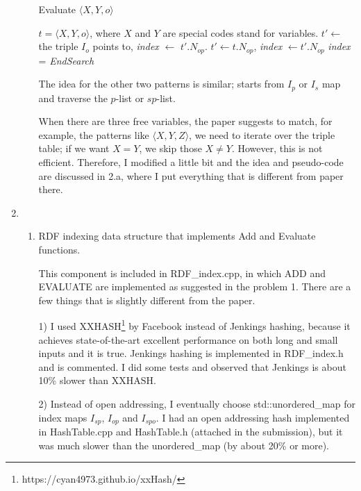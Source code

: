 \documentclass{article}
\begin{document}
\begin{enumerate}
\begin{enumerate}
\begin{algorithm}[H]
\caption{Evaluate $\langle X, Y, o\rangle$}\label{alg:evaluateXYO}
\begin{algorithmic}
\Require $t = \langle X, Y, o\rangle$, where $X$ and $Y$ are special codes stand for variables. 
\Do
{}
\State $t'\leftarrow$ the triple $I_{o}$ points to, \textit{index} $\leftarrow$ $t'.N_{op}$.
\Else 
\State $t'\leftarrow t.N_{op}$, \textit{index} $\leftarrow t'.N_{op}$
\EndIf
{}
\State \textit{index} = \textit{EndSearch}
\EndIf
\end{algorithmic}
\end{algorithm}
The idea for the other two patterns is similar; starts from $I_p$ or $I_s$ map and traverse the $p$-list or $sp$-list.

When there are three free variables, the paper suggests to match, for example, the patterns like $\langle X, Y, Z\rangle$, we need to iterate over the triple table; if we want $X = Y$,  we skip those $X\neq Y$. However, this is not efficient. Therefore, I modified a little bit and the idea and pseudo-code are discussed in 2.a, where I put everything that is different from paper there. 

\end{enumerate}
\item 
\begin{enumerate}
\item RDF indexing data structure that implements Add and Evaluate functions.

This component is included in RDF\_index.cpp, in which ADD and EVALUATE are implemented as suggested in the problem 1. There are a few things that is slightly different from the paper. 

1) I used XXHASH\footnote{https://cyan4973.github.io/xxHash/} by Facebook instead of Jenkings hashing, because it achieves state-of-the-art excellent performance on both long and small inputs and it is true. Jenkings hashing is implemented in RDF\_index.h and is commented. I did some tests and observed that Jenkings is about 10\% slower than XXHASH. 

2) Instead of open addressing, I eventually choose std::unordered\_map for index maps $I_{sp}$, $I_{op}$ and $I_{spo}$. I had an open addressing hash implemented in HashTable.cpp and HashTable.h (attached in the submission), but it was much slower than the unordered\_map (by about 20\% or more).


\end{enumerate}
\end{enumerate}
\end{document}
